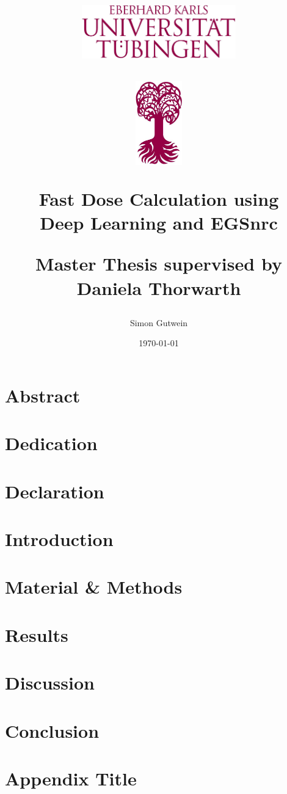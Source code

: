 \documentclass[12pt]{report} %
\title{
	\centering
	\includegraphics[width=0.5\textwidth]{logo4}\par\vspace{1cm}
	\includegraphics[width=0.15\textwidth]{logo3}\par\vspace{1cm}
	{\huge\bfseries Fast Dose Calculation using \\ Deep Learning and EGSnrc\par}
	\vspace{1cm}
	{\fontsize{20.74}{0}\selectfont Master Thesis}\vspace{3cm}
	\vfill
	{\fontsize{17}{18}\selectfont supervised by \fontsize{17}{18}\selectfont\\ Daniela Thorwarth}
	\vfill
}
\author{Simon Gutwein}
\date{\today}
\begin{document}
\maketitle

\chapter{Abstract}


\chapter{Dedication}


\chapter{Declaration}


\tableofcontents
\listoffigures
\listoftables

\chapter{Introduction}


\chapter{Material \& Methods}


\chapter{Results}


\chapter{Discussion}


\chapter{Conclusion}


\printbibliography

\appendix
\chapter{Appendix Title}

\end{document}
